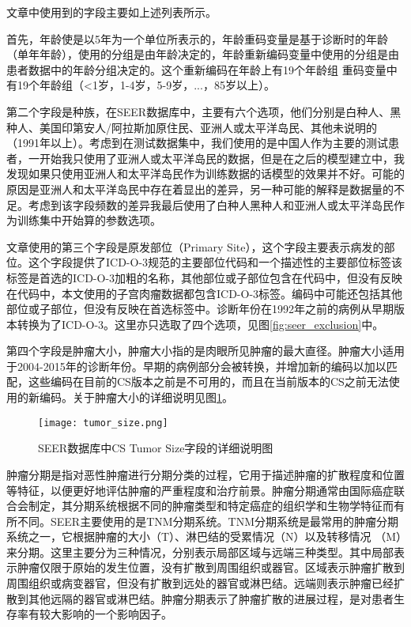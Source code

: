 文章中使用到的字段主要如上述列表所示。

首先，年龄使是以5年为一个单位所表示的，年龄重码变量是基于诊断时的年龄（单年年龄），使用的分组是由年龄决定的，年龄重新编码变量中使用的分组是由患者数据中的年龄分组决定的。这个重新编码在年龄上有19个年龄组 重码变量中有19个年龄组（<1岁，1-4岁，5-9岁，...，85岁以上）。

第二个字段是种族，在SEER数据库中，主要有六个选项，他们分别是白种人、黑种人、美国印第安人/阿拉斯加原住民、亚洲人或太平洋岛民、其他未说明的（1991年以上）。考虑到在测试数据集中，我们使用的是中国人作为主要的测试患者，一开始我只使用了亚洲人或太平洋岛民的数据，但是在之后的模型建立中，我发现如果只使用亚洲人和太平洋岛民作为训练数据的话模型的效果并不好。可能的原因是亚洲人和太平洋岛民中存在着显出的差异，另一种可能的解释是数据量的不足。考虑到该字段频数的差异我最后使用了白种人黑种人和亚洲人或太平洋岛民作为训练集中开始算的参数选项。

文章使用的第三个字段是原发部位（Primary Site），这个字段主要表示病发的部位。这个字段提供了ICD-O-3规范的主要部位代码和一个描述性的主要部位标签该标签是首选的ICD-O-3加粗的名称，其他部位或子部位包含在代码中，但没有反映在代码中，本文使用的子宫肉瘤数据都包含ICD-O-3标签。编码中可能还包括其他部位或子部位，但没有反映在首选标签中。诊断年份在1992年之前的病例从早期版本转换为了ICD-O-3。这里亦只选取了四个选项，见图\ref{fig:seer_exclusion}中。

第四个字段是肿瘤大小，肿瘤大小指的是肉眼所见肿瘤的最大直径。肿瘤大小适用于2004-2015年的诊断年份。早期的病例部分会被转换，并增加新的编码以加以匹配，这些编码在目前的CS版本之前是不可用的，而且在当前版本的CS之前无法使用的新编码。关于肿瘤大小的详细说明见图\ref{fig:tumor_size}。

\begin{figure}[!htbp]
    \centering
    \texttt{[image: tumor\_size.png]}
    \caption{SEER数据库中CS Tumor Size字段的详细说明图} \label{fig:tumor_size}
\end{figure}

肿瘤分期是指对恶性肿瘤进行分期分类的过程，它用于描述肿瘤的扩散程度和位置等特征，以便更好地评估肿瘤的严重程度和治疗前景。肿瘤分期通常由国际癌症联合会制定，其分期系统根据不同的肿瘤类型和特定癌症的组织学和生物学特征而有所不同。SEER主要使用的是TNM分期系统。TNM分期系统是最常用的肿瘤分期系统之一，它根据肿瘤的大小（T）、淋巴结的受累情况（N）以及转移情况 （M）来分期。这里主要分为三种情况，分别表示局部区域与远端三种类型。其中局部表示肿瘤仅限于原始的发生位置，没有扩散到周围组织或器官。区域表示肿瘤扩散到周围组织或病变器官，但没有扩散到远处的器官或淋巴结。远端则表示肿瘤已经扩散到其他远隔的器官或淋巴结。肿瘤分期表示了肿瘤扩散的进展过程，是对患者生存率有较大影响的一个影响因子。

